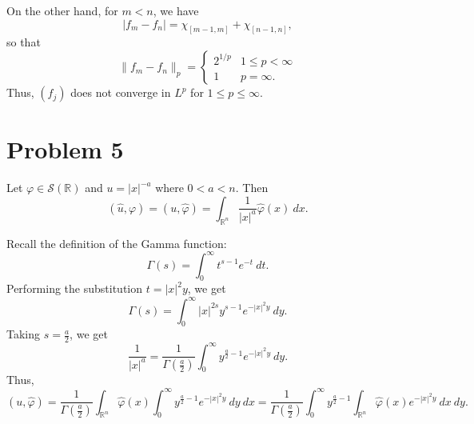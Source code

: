 \documentclass[10pt]{amsart}
\theoremstyle{thmstyle}
\theoremstyle{defstyle}
\newcommand{\R}{\mathbb{R}}
\newcommand{\scrS}{\mathscr S}
\newcommand{\wh}[1]{\widehat{#1}}
\renewcommand{\le}{\leqslant}
\begin{document}
On the other hand, for $m < n$, we have 
\begin{equation*}
    |f_m - f_n| = \chi_{[m - 1, m]} + \chi_{[n - 1, n]},
\end{equation*}
so that 
\begin{equation*}
    \|f_m - f_n\|_p = 
    \begin{cases}
        2^{1/p} & 1\le p < \infty \\
        1 & p = \infty.
    \end{cases}
\end{equation*}
Thus, $(f_j)$ does not converge in $L^p$ for $1\le p\le\infty$.

\section{Problem 5}

Let $\varphi\in\scrS(\R)$ and $u = |x|^{- a}$ where $0 < a < n$. Then 
\begin{equation*}
    ( \wh u, \varphi) = ( u, \wh\varphi) = \int_{\R^n} \frac{1}{|x|^a}\wh\varphi(x)~dx.
\end{equation*}

Recall the definition of the Gamma function: 
\begin{equation*}
    \Gamma(s) = \int_{0}^\infty t^{s - 1}e^{-t}~dt.
\end{equation*}
Performing the substitution $t = |x|^2y$, we get 
\begin{equation*}
    \Gamma(s) = \int_{0}^\infty |x|^{2s} y^{s - 1} e^{-|x|^2 y}~dy.
\end{equation*}
Taking $s = \frac{a}{2}$, we get 
\begin{equation*}
    \frac{1}{|x|^a} = \frac{1}{\Gamma\left(\frac{a}{2}\right)}\int_{0}^\infty y^{\frac{a}{2} - 1}e^{-|x|^2 y}~dy.
\end{equation*}
Thus, 
\begin{equation*}
    (u, \wh\varphi) = \frac{1}{\Gamma\left(\frac{a}{2}\right)}\int_{\R^n}\wh\varphi(x)\int_0^\infty y^{\frac{a}{2} - 1}e^{-|x|^2 y}~dy~dx = \frac{1}{\Gamma\left(\frac{a}{2}\right)}\int_0^\infty y^{\frac{a}{2} - 1}\int_{\R^n}\wh\varphi(x)e^{-|x|^2 y}~dx~dy.
\end{equation*}
\end{document}
